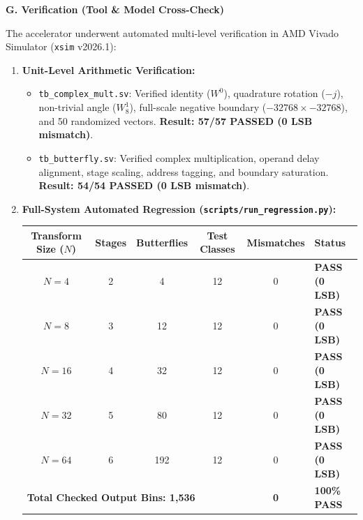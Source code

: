 \documentclass[10pt,a4paper]{article}
\newcommand{\reportsection}[1]{%
  \vspace{3mm}%
  \noindent
  \begin{tcolorbox}[
    colback=tableheaderbg,
    colframe=bordergray,
    arc=1.2mm,
    boxrule=0.8pt,
    left=4mm, right=4mm, top=2.2mm, bottom=2.2mm
  ]
    {\Large\bfseries\color{headerblue}#1}
  \end{tcolorbox}%
  \vspace{1mm}%
}
\begin{document}
\reportsection{G. Verification (Tool \& Model Cross-Check)}

The accelerator underwent automated multi-level verification in AMD Vivado Simulator (\texttt{xsim} v2026.1):

\begin{enumerate}[label=\bfseries\arabic*., leftmargin=6mm, itemsep=3pt]
    \item \textbf{Unit-Level Arithmetic Verification:}
    \begin{itemize}
        \item \texttt{tb\_complex\_mult.sv}: Verified identity ($W^0$), quadrature rotation ($-j$), non-trivial angle ($W_8^1$), full-scale negative boundary ($-32768 \times -32768$), and 50 randomized vectors. \textbf{Result: 57/57 PASSED (0 LSB mismatch)}.
        \item \texttt{tb\_butterfly.sv}: Verified complex multiplication, operand delay alignment, stage scaling, address tagging, and boundary saturation. \textbf{Result: 54/54 PASSED (0 LSB mismatch)}.
    \end{itemize}
    \item \textbf{Full-System Automated Regression (\texttt{scripts/run\_regression.py}):}
    \begin{table}[H]
    \centering
    \small
    \begin{tabularx}{\textwidth}{|c|c|c|c|c|>{\centering\arraybackslash}X|}
    \hline
    \rowcolor{tableheaderbg}
    \bfseries Transform Size ($N$) & \bfseries Stages & \bfseries Butterflies & \bfseries Test Classes & \bfseries Mismatches & \bfseries Status \\
    \hline
    $N = 4$  & 2 & 4   & 12 & 0 & \textbf{PASS (0 LSB)} \\
    $N = 8$  & 3 & 12  & 12 & 0 & \textbf{PASS (0 LSB)} \\
    $N = 16$ & 4 & 32  & 12 & 0 & \textbf{PASS (0 LSB)} \\
    $N = 32$ & 5 & 80  & 12 & 0 & \textbf{PASS (0 LSB)} \\
    $N = 64$ & 6 & 192 & 12 & 0 & \textbf{PASS (0 LSB)} \\
    \hline
    \multicolumn{4}{|l|}{\textbf{Total Checked Output Bins: 1,536}} & \textbf{0} & \textbf{100\% PASS} \\
    \hline
    \end{tabularx}

\end{table}
\end{enumerate}
\end{document}
